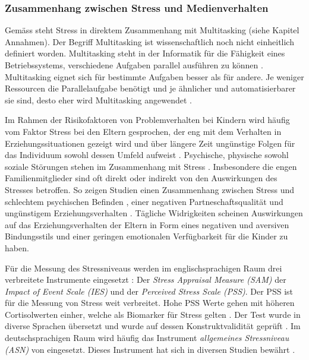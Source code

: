 \subsubsection{Zusammenhang zwischen Stress und Medienverhalten}
Gemäss  steht Stress in direktem Zusammenhang mit Multitasking (siehe Kapitel Annahmen). Der Begriff Multitasking ist wissenschaftlich noch nicht einheitlich definiert worden. Multitasking steht in der Informatik für die Fähigkeit eines Betriebssystems, verschiedene Aufgaben parallel ausführen zu können \cite{Zimber2016}. Multitasking eignet sich für bestimmte Aufgaben besser als für andere. Je weniger Ressourcen die Parallelaufgabe benötigt und je ähnlicher und automatisierbarer sie sind, desto eher wird Multitasking angewendet \cite[S.~10]{Zimber2016}.

Im Rahmen der Risikofaktoren von Problemverhalten bei Kindern wird häufig vom Faktor Stress bei den Eltern gesprochen, der eng mit dem Verhalten in Erziehungssituationen gezeigt wird und über längere Zeit ungünstige Folgen für das Individuum sowohl dessen Umfeld aufweist \cite{Cina2009}. Psychische, physische sowohl soziale Störungen stehen im Zusammenhang mit Stress \cite{Elfering2002, Burisch1994}. Insbesondere die engen Familienmitglieder sind oft direkt oder indirekt von den Auswirkungen des Stresses betroffen. So zeigen Studien einen Zusammenhang zwischen Stress und schlechtem psychischen Befinden \cite{Burisch1994, Krohne1997}, einer negativen Partneschaftsqualität \cite{Bodenmann2000, Bodenmann1999, Bodenmann2000a} und ungünstigem Erziehungsverhalten \cite{Abidin1992, Belsky1984, WebsterStratton2000}. Tägliche Widrigkeiten scheinen Auswirkungen auf das Erziehungsverhalten der Eltern in Form eines negativen und aversiven Bindungsstils \cite{Dumas1989, Webster-Stratton1988} und einer geringen emotionalen Verfügbarkeit für die Kinder \cite{Campbell1991} zu haben.

Für die Messung des Stressniveaus werden im englischsprachigen Raum drei verbreitete Instrumente eingesetzt \cite{Andreou2011}: Der \textit{Stress Appraisal Measure (SAM)} der \textit{Impact of Event Scale (IES)} und der \textit{Perceived Stress Scale (PSS)}. Der PSS ist für die Messung von Stress weit verbreitet. Hohe PSS Werte gehen mit höheren Cortisolwerten einher, welche als Biomarker für Stress gelten \cite{Malarkey1995, VanEck2005}. Der Test wurde in diverse Sprachen übersetzt und wurde auf dessen Konstruktvalidität geprüft \cite{Cohen1988, Byrne2005}. Im deutschsprachigen Raum wird häufig das Instrument \textit{allgemeines Stressniveau (ASN)} von  eingesetzt. Dieses Instrument hat sich in diversen Studien bewährt \cite{Cina2009}.

